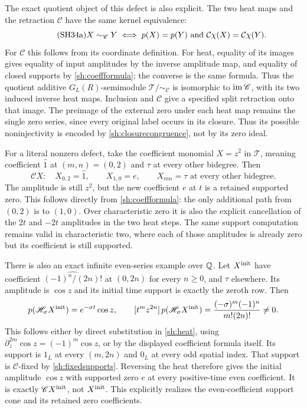 The exact quotient object of this defect is also explicit.
The two heat maps and the retraction $\mathscr C$ have the
same kernel equivalence:
\begin{equation}\tag{SH34a}\label{sh:closurecongruence}
 X\sim_{\mathscr C}Y
 \iff p(X)=p(Y)\ \hbox{and}\
            \mathcal C\chi(X)=\mathcal C\chi(Y).
\end{equation}
For $\mathscr C$ this follows from its coordinate definition.
For heat, equality of its images gives equality of input
amplitudes by the inverse amplitude map, and equality of
closed supports by \eqref{sh:coeffformula}; the converse is
the same formula. Thus the quotient additive $G_L(R)$-semimodule
$\mathscr T/{\sim_{\mathscr C}}$ is isomorphic to
$\operatorname{im}\mathscr C$, with its two induced inverse heat maps.
Inclusion and $\mathscr C$ give a specified split retraction
onto that image. The preimage of the external zero under each
heat map remains the single zero series, since every original
label occurs in its closure. Thus its possible noninjectivity
is encoded by \eqref{sh:closurecongruence}, not by its zero ideal.

For a literal nonzero defect, take the coefficient monomial
$X=z^2$ in $\mathscr T$, meaning coefficient $\widehat1$
at $(m,n)=(0,2)$ and $\tau$ at every other bidegree. Then
\begin{equation}\tag{SH35}\label{sh:zerotail}
 \mathscr C X:
 \quad X_{0,2}=\widehat1,\qquad
 X_{1,0}=e,\qquad
 X_{mn}=\tau\text{ at every other bidegree}.
\end{equation}
The amplitude is still $z^2$, but the new coefficient $e$ at
$t$ is a retained supported zero. This follows directly from
\eqref{sh:coeffformula}: the only additional path from $(0,2)$
is to $(1,0)$. Over characteristic zero it is also the explicit
cancellation of the $2t$ and $-2t$ amplitudes in the two heat
steps. The same support computation remains valid in
characteristic two, where each of those amplitudes is already
zero but its coefficient is still supported.

There is also an exact infinite even-series example over $\mathbb Q$.
Let $X^{\rm init}$ have coefficient
$\widehat{(-1)^n/(2n)!}$ at $(0,2n)$ for every $n\ge0$,
and $\tau$ elsewhere. Its amplitude is $\cos z$ and its
initial time support is exactly the zeroth row. Then
\[
 p(\mathscr H_\sigma X^{\rm init})
       =e^{-\sigma t}\cos z,\qquad
 [t^mz^{2n}]\,p(\mathscr H_\sigma X^{\rm init})
       =\frac{(-\sigma)^m(-1)^n}{m!(2n)!}\ne0 .
\]
This follows either by direct substitution in \eqref{sh:heat},
using $\partial_z^{2m}\cos z=(-1)^m\cos z$, or by the
displayed coefficient formula itself. Its support is $1_L$ at
every $(m,2n)$ and $0_L$ at every odd spatial index.
That support is $\mathcal C$-fixed by \eqref{sh:fixedsupports}.
Reversing the heat therefore gives the initial amplitude
$\cos z$ with supported zero $e$ at every positive-time even
coefficient. It is exactly $\mathscr C X^{\rm init}$, not
$X^{\rm init}$. This explicitly realizes the even-coefficient
support cone and its retained zero coefficients.

